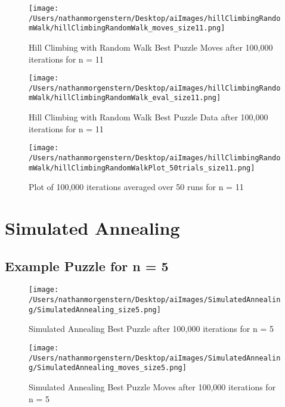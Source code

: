 \documentclass{report}
\begin{document}
	\begin{figure}[H]
	\centering
	\texttt{[image: /Users/nathanmorgenstern/Desktop/aiImages/hillClimbingRandomWalk/hillClimbingRandomWalk\_moves\_size11.png]}
	\caption{Hill Climbing with Random Walk Best Puzzle Moves after 100,000 iterations for n = 11} 
	\label{fig: Hill Climbing with Random Walk Best Puzzle Moves after 100,000 iterations for n = 11}
	\end{figure}

	\begin{figure}[H]
	\centering
	\texttt{[image: /Users/nathanmorgenstern/Desktop/aiImages/hillClimbingRandomWalk/hillClimbingRandomWalk\_eval\_size11.png]}
	\caption{Hill Climbing with Random Walk Best Puzzle Data after 100,000 iterations for n = 11} 
	\label{fig: Hill Climbing with Random Walk Best Puzzle Data after 100,000 iterations for n = 11}
	\end{figure}

	\begin{figure}[H]
	\centering
	\texttt{[image: /Users/nathanmorgenstern/Desktop/aiImages/hillClimbingRandomWalk/hillClimbingRandomWalkPlot\_50trials\_size11.png]}
	\caption{Plot of 100,000 iterations averaged over 50 runs for n = 11}
	\label{fig: Plot of 100,000 iterations averaged over 50 runs for n = 11}
	\end{figure}


\newpage
\section{Simulated Annealing}

\subsection{Example Puzzle for n = 5}

	\begin{figure}[H]
	\centering
	\texttt{[image: /Users/nathanmorgenstern/Desktop/aiImages/SimulatedAnnealing/SimulatedAnnealing\_size5.png]}
	\caption{Simulated Annealing Best Puzzle after 100,000 iterations for n = 5} 
	\label{fig: Simulated Annealing Best Puzzle after 100,000 iterations for n = 5}
	\end{figure}
	
	\begin{figure}[H]
	\centering
	\texttt{[image: /Users/nathanmorgenstern/Desktop/aiImages/SimulatedAnnealing/SimulatedAnnealing\_moves\_size5.png]}
	\caption{Simulated Annealing Best Puzzle Moves after 100,000 iterations for n = 5} 
	\label{fig: Simulated Annealing Best Puzzle Moves after 100,000 iterations for n = 5}
	\end{figure}
\end{document}

